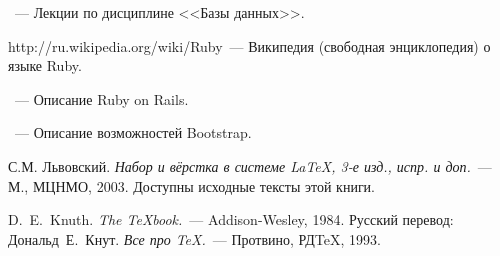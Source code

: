 \begin{thebibliography}{}

~---
Лекции по дисциплине <<Базы данных>>.

{http://ru.wikipedia.org/wiki/Ruby}~---
Википедия (свободная энциклопедия) о языке Ruby.

~---
Описание Ruby on Rails.

~---
Описание возможностей Bootstrap.

С.М. Львовский.
{\em Набор и вёрстка в системе \LaTeX, 3-е изд., испр. и доп.}~---
М., МЦНМО, 2003. Доступны исходные тексты этой книги.

D.~E.~Knuth. {\em The \TeX{}book.}~---
Addison-Wesley, 1984. Русский перевод:
Дональд~Е.~Кнут.
{\em Все про \TeX.}~--- Протвино, РД\TeX, 1993.


\end{thebibliography}
